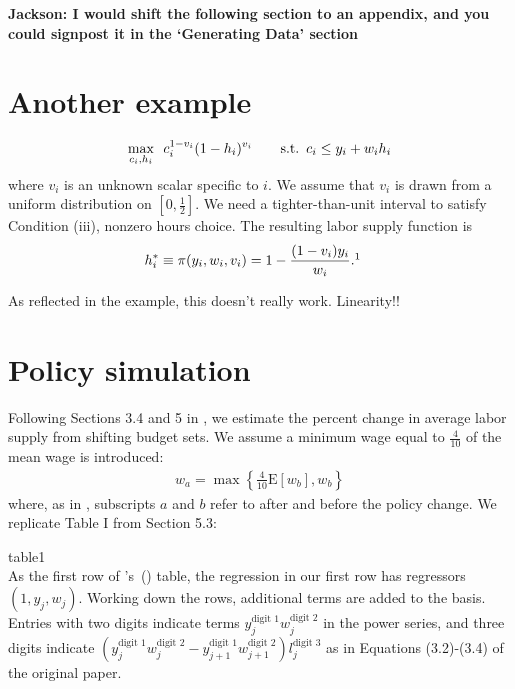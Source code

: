 \documentclass[11pt,letterpaper]{article}                  %
\newcommand\citepos[1]{\citeauthor{#1}'s\ (\citeyear{#1})}
\begin{document}
\textbf{Jackson: I would shift the following section to an appendix, and you could signpost
  it in the `Generating Data' section}
\section{Another example}
\label{sec:ex2}

\begin{align*}
	\max_{c_i, h_i} \enskip c_i^{1-v_i} (1-h_i)^{v_i} \qquad \text{s.t.} \enskip c_i \leq y_i + w_i h_i
\end{align*}
where $v_i$ is an unknown scalar specific to $i$.
We assume that $v_i$ is drawn from a uniform distribution on $[0, \tfrac{1}{2}]$.
We need a tighter-than-unit interval to satisfy Condition (iii), nonzero hours choice.
The resulting labor supply function is
\begin{align*}
	h^*_i &\equiv \pi (y_i, w_i, v_i) = 1 - \frac{(1-v_i) y_i}{w_i}.\footnotemark
\end{align*}

As reflected in the example, this doesn't really work.
Linearity!!



\section{Policy simulation}
\label{sec:policy}

Following Sections 3.4 and 5 in \citet{Blomquist2002}, we estimate the percent change in average labor supply from shifting budget sets.
We assume a minimum wage equal to $\tfrac{4}{10}$ of the mean wage is introduced:
\begin{align*}
  w_a = \max\left\{\tfrac{4}{10} \mathrm{E}[w_b], w_b\right\}
\end{align*}
where, as in \citet{Blomquist2002}, subscripts $a$ and $b$ refer to after and before the policy change.
We replicate Table I from Section 5.3:

 {table1} \mbox{} \\

As the first row of \citepos{Blomquist2002} table, the regression in our first row has regressors $(1,y_j,w_j)$.
Working down the rows, additional terms are added to the basis.
Entries with two digits indicate terms $y_j^{\text{digit }1}w_j^{\text{digit }2}$ in the power series, and three digits indicate $(y_{j}^{\text{digit }1}w_j^{\text{digit }2} -
y_{j+1}^{\text{digit }1}w_{j+1}^{\text{digit }2})l_j^{\text{digit }3}$ as in Equations (3.2)-(3.4) of the original paper.
\end{document}
